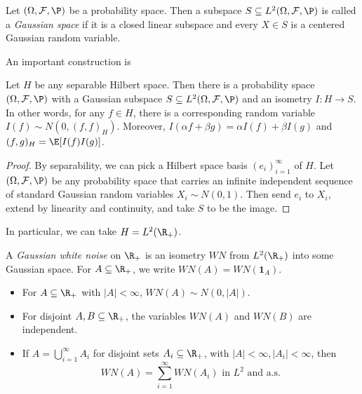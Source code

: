 \documentclass[a4paper]{article}
\begin{document}
\begin{defi}
  Let $(\Omega, \mathcal{F}, \P)$ be a probability space. Then a subspace $S \subseteq L^2(\Omega, \mathcal{F}, \P)$ is called a \emph{Gaussian space} if it is a closed linear subspace and every $X \in S$ is a centered Gaussian random variable.
\end{defi}

An important construction is
\begin{prop}
  Let $H$ be any separable Hilbert space. Then there is a probability space $(\Omega, \mathcal{F}, \P)$ with a Gaussian subspace $S \subseteq L^2(\Omega, \mathcal{F}, \P)$ and an isometry $I: H \to S$. In other words, for any $f \in H$, there is a corresponding random variable $I(f) \sim N(0, (f, f)_H)$. Moreover, $I(\alpha f + \beta g) = \alpha I(f) + \beta I(g)$ and $(f, g)_H = \E[I(f) I(g)]$.
\end{prop}

\begin{proof}
  By separability, we can pick a Hilbert space basis $(e_i)_{i = 1}^\infty$ of $H$. Let $(\Omega, \mathcal{F}, \P)$ be any probability space that carries an infinite independent sequence of standard Gaussian random variables $X_i \sim N(0, 1)$. Then send $e_i$ to $X_i$, extend by linearity and continuity, and take $S$ to be the image.
\end{proof}

In particular, we can take $H = L^2(\R_+)$.

\begin{defi}
  A \emph{Gaussian white noise} on $\R_+$ is an isometry $WN$ from $L^2(\R_+)$ into some Gaussian space. For $A \subseteq \R_+$, we write $WN(A) = WN(\mathbf{1}_A)$.
\end{defi}

\begin{prop}\leavevmode
  \begin{itemize}
    \item For $A \subseteq \R_+$ with $|A| < \infty$, $WN(A) \sim N(0, |A|)$.
    \item For disjoint $A, B \subseteq \R_+$, the variables $WN(A)$ and $WN(B)$ are independent.
    \item If $A = \bigcup_{i = 1}^\infty A_i$ for disjoint sets $A_i \subseteq \R_+$, with $|A| < \infty, |A_i| < \infty$, then
      \[
        WN(A) = \sum_{i = 1}^\infty WN(A_i)\text{ in $L^2$ and a.s.}
      \]
  \end{itemize}
\end{prop}
\end{document}
